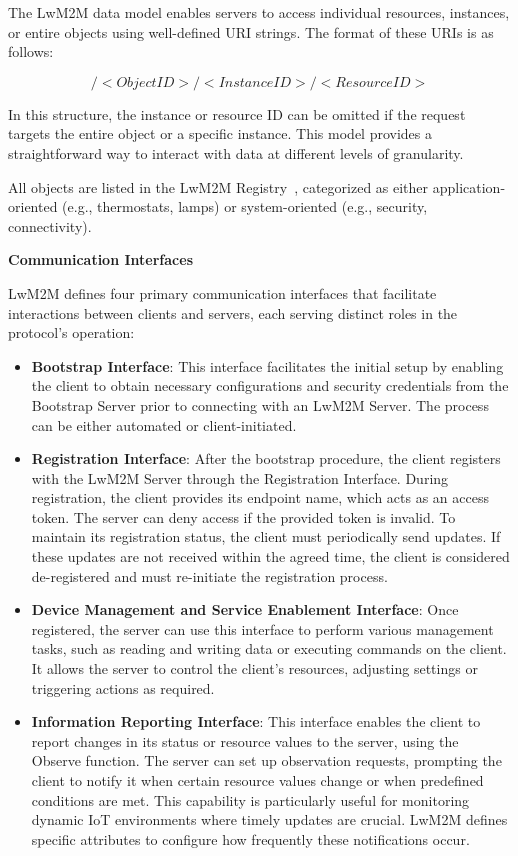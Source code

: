 \documentclass[11pt,sigconf]{iabart}
\begin{document}
The LwM2M data model enables servers to access individual resources, instances, or entire objects using well-defined URI strings. The format of these URIs is as follows:

\[
/<Object ID>/<Instance ID>/<Resource ID>
\]

In this structure, the instance or resource ID can be omitted if the request targets the entire object or a specific instance. This model provides a straightforward way to interact with data at different levels of granularity.

All objects are listed in the LwM2M Registry~\cite{lwm2m-registry}, categorized as either application-oriented (e.g., thermostats, lamps) or system-oriented (e.g., security, connectivity).

\textbf{Communication Interfaces}

LwM2M defines four primary communication interfaces that facilitate interactions between clients and servers, each serving distinct roles in the protocol's operation:

\begin{itemize}
  \item \textbf{Bootstrap Interface}: This interface facilitates the initial setup by enabling the client to obtain necessary configurations and security credentials from the Bootstrap Server prior to connecting with an LwM2M Server. The process can be either automated or client-initiated.
  
  \item \textbf{Registration Interface}: After the bootstrap procedure, the client registers with the LwM2M Server through the Registration Interface. During registration, the client provides its endpoint name, which acts as an access token. The server can deny access if the provided token is invalid. To maintain its registration status, the client must periodically send updates. If these updates are not received within the agreed time, the client is considered de-registered and must re-initiate the registration process.
  
  \item \textbf{Device Management and Service Enablement Interface}: Once registered, the server can use this interface to perform various management tasks, such as reading and writing data or executing commands on the client. It allows the server to control the client's resources, adjusting settings or triggering actions as required.
  
  \item \textbf{Information Reporting Interface}: This interface enables the client to report changes in its status or resource values to the server, using the Observe function. The server can set up observation requests, prompting the client to notify it when certain resource values change or when predefined conditions are met. This capability is particularly useful for monitoring dynamic IoT environments where timely updates are crucial. LwM2M defines specific attributes to configure how frequently these notifications occur.
\end{itemize}
\end{document}

